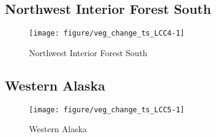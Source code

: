 \documentclass{article}\usepackage[]{graphicx}\usepackage[]{color}
\makeatletter
\def\maxwidth{ %
  \ifdim\Gin@nat@width>\linewidth
    \linewidth
  \else
    \Gin@nat@width
  \fi
}
\makeatother
\begin{document}
\subsection{Northwest Interior Forest South}
\begin{figure}[H]
\texttt{[image: figure/veg\_change\_ts\_LCC4-1]} \caption[Northwest Interior Forest South]{Northwest Interior Forest South}\label{fig:veg_change_ts_LCC4}
\end{figure}



\subsection{Western Alaska}
\begin{figure}[H]
\texttt{[image: figure/veg\_change\_ts\_LCC5-1]} \caption[Western Alaska]{Western Alaska}\label{fig:veg_change_ts_LCC5}
\end{figure}
\end{document}
